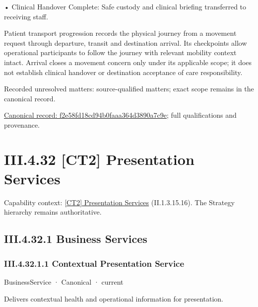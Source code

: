 •
Clinical Handover Complete: Safe custody and clinical briefing transferred to receiving staff.



Patient transport progression records the physical journey from a movement request through departure, transit and destination arrival. Its checkpoints allow operational participants to follow the journey with relevant mobility context intact. Arrival closes a movement concern only under its applicable scope; it does not establish clinical handover or destination acceptance of care responsibility.


{\small Recorded unresolved matters: source-qualified matters; exact scope remains in the canonical record.}\par
{\footnotesize \href{../../../../continuum/business/business-process/f2e58fd18cd94b0faaa364d3890a7c9e.md}{Canonical record: f2e58fd18cd94b0faaa364d3890a7c9e}; full qualifications and provenance.}\par
\section*{III.4.32 [CT2] Presentation Services}
\label{navigation:III.4.32}

{\small Capability context: \hyperref[element:e9b6ba1917ba44cca7466444d0836c98]{[CT2] Presentation Services} (II.1.3.15.16). The Strategy hierarchy remains authoritative.}\par
\subsection*{III.4.32.1 Business Services}
\label{navigation:III.4.32.1}

\subsubsection*{III.4.32.1.1 Contextual Presentation Service}
\label{navigation:III.4.32.1.1}

\label{element:905d44b44f434fa4974e09dcafac016a}
{\small BusinessService · Canonical · current}\par

Delivers contextual health and operational information for presentation.


